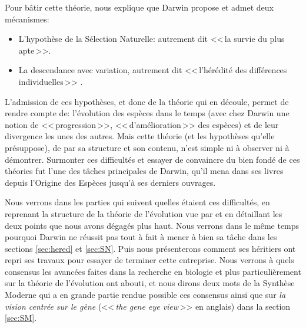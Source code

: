 Pour bâtir cette théorie, \cite{gayon1991darwinetlapresdarwin} nous explique que Darwin propose et admet deux mécanismes:
\begin{itemize}
	\item L'hypothèse de la Sélection Naturelle: autrement dit <<\,la survie du plus apte\,>>.
	\item La descendance avec variation, autrement dit <<\,l'hérédité des différences individuelles\,>> \citep{gayon1991darwinetlapresdarwin}.
\end{itemize}

L'admission de ces hypothèses, et donc de la théorie qui en découle, permet de rendre compte de: l'évolution des espèces dans le temps (avec chez Darwin une notion de <<\,progression\,>>, <<\,d'amélioration\,>> des espèces) et de leur divergence les unes des autres. Mais cette théorie (et les hypothèses qu'elle présuppose), de par sa structure et son contenu, n'est simple ni à observer ni à démontrer. Surmonter ces difficultés et essayer de convaincre du bien fondé de ces théories fut l'une des tâches principales de Darwin, qu'il mena dans ses livres depuis l'Origine des Espèces jusqu'à ses derniers ouvrages. 

Nous verrons dans les parties qui suivent quelles étaient ces difficultés, en reprenant la structure de la théorie de l'évolution vue par \cite{gayon1991darwinetlapresdarwin} et en détaillant les deux points que nous avons dégagés plus haut. Nous verrons dans le même temps pourquoi Darwin ne réussit pas tout à fait à mener à bien sa tâche dans les sections \ref{sec:hered} et \ref{sec:SN}. Puis nous présenterons comment ses héritiers ont repri ses travaux pour essayer de terminer cette entreprise. Nous verrons à quels consensus les avancées faites dans la recherche en biologie et plus particulièrement sur la théorie de l'évolution ont abouti, et nous dirons deux mots de la Synthèse Moderne qui a en grande partie rendue possible ces consensus ainsi que sur \emph{la vision centrée sur le gène} (<<\,\emph{the gene eye view}\,>> en anglais) dans la section \ref{sec:SM}. 


